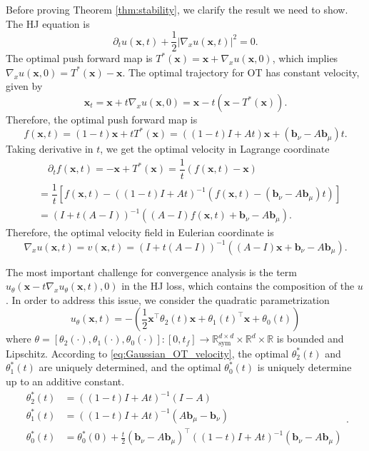\documentclass{article} %
\theoremstyle{plain}
\theoremstyle{definition}
\theoremstyle{remark}
\newcommand{\R}{\mathbb{R}}
\newcommand{\bx}{\mathbf{x}}
\newcommand{\bb}{\mathbf{b}}
\newcommand{\pt}{\partial_t}
\newcommand{\nx}{\nabla_x}
\newcommand{\tp}{^{\top}}
\newcommand{\parentheses}[1]{\left(#1\right)}
\newcommand{\sqbra}[1]{\left[#1\right]}
\newcommand{\abs}[1]{\left|#1\right|}
\begin{document}
Before proving Theorem \ref{thm:stability}, we clarify the result we need to show.  The HJ equation is 
$$\pt u(\bx,t) + \frac12 \abs{\nx u(\bx,t)}^2 = 0.$$
The optimal push forward map is $T^*(\bx) = \bx + \nx u(\bx,0)$, which implies $\nx u(\bx,0) = T^*(\bx) - \bx$. The optimal trajectory for OT has constant velocity, given by
$$\bx_t = \bx + t \nx u (\bx,0) = \bx - t(\bx-T^*(\bx)).$$
Therefore, the optimal push forward map is 
$$f(\bx,t) = (1-t)\bx + tT^*(\bx) = \parentheses{(1-t)I + At}\bx + (\bb_\nu - A \bb_\mu)t.$$
Taking derivative in $t$, we get the optimal velocity in Lagrange coordinate
\begin{align*}
& \quad \pt f(\bx,t) = -\bx + T^*(\bx) = \dfrac{1}{t}(f(\bx,t)-\bx) \\
& = \dfrac{1}{t} \sqbra{ f(\bx,t) - \parentheses{(1-t)I + At}^{-1} \parentheses{f(\bx,t) - (\bb_\nu - A \bb_\mu)t}} \\
& = \parentheses{I + t(A-I)}^{-1} \parentheses{(A-I)f(\bx,t) + \bb_\nu - A \bb_\mu}.
\end{align*}
Therefore, the optimal velocity field in Eulerian coordinate is
\begin{equation}\label{eq:Gaussian_OT_velocity}
\nx u(\bx,t) =v(\bx,t) = \parentheses{I + t(A-I)}^{-1} \parentheses{(A-I)\bx + \bb_\nu - A \bb_\mu}.
\end{equation}

The most important challenge for convergence analysis is the term $u_\theta(\bx-t\nx u_\theta(\bx,t),0)$ in the HJ loss, which contains the composition of the $u$. In order to address this issue, we consider the quadratic parametrization
\begin{equation}\label{eq:u_parametrization}
u_\theta(\bx,t) = -\parentheses{\frac12 \bx\tp \theta_2(t) \bx + \theta_1(t)\tp \bx + \theta_0(t)}
\end{equation}
where $\theta = [\theta_2(\cdot), \theta_1(\cdot), \theta_0(\cdot)]:[0,t_f] \to \R^{d\times d}_{\text{sym}} \times \R^d \times \R$ is bounded and Lipschitz. According to \eqref{eq:Gaussian_OT_velocity}, the optimal $\theta_2^*(t)$ and $\theta_1^*(t)$ are uniquely determined, and the optimal $\theta_0^*(t)$ is uniquely determine up to an additive constant.
\begin{equation}\label{eq:optimal_u210}
\begin{aligned}
\theta_2^*(t) &= \parentheses{(1-t)I + At}^{-1} (I-A)\\
\theta_1^*(t) &= \parentheses{(1-t)I + At}^{-1} (A \bb_\mu - \bb_\nu)\\
\theta_0^*(t) &= \theta_0^*(0) + \frac{t}{2} (\bb_\nu-A\bb_\mu)\tp \parentheses{(1-t)I + At}^{-1} (\bb_\nu-A\bb_\mu)\\
\end{aligned}.
\end{equation}
\end{document}

